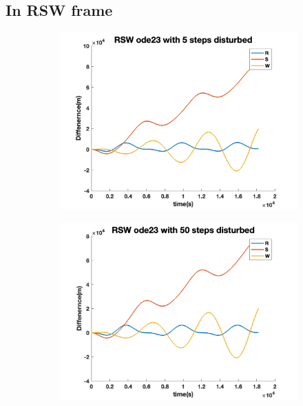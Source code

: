 \documentclass[12pt
,headinclude
,headsepline
,bibtotocnumbered
]{scrartcl}
\begin{document}
    \subsection*{In RSW frame}
    \begin{figure}[H]
        \centering
        \begin{subfigure}[b]{0.45\textwidth}
        \includegraphics[width=1\textwidth]{./plots/ode23_5_yprime_d_RSW.png}
        \end{subfigure}
        \begin{subfigure}[b]{0.45\textwidth}
        \includegraphics[width=1\textwidth]{./plots/ode23_50_yprime_d_RSW.png}
        \end{subfigure}
        \begin{subfigure}[b]{0.45\textwidth}

\end{subfigure}
\end{figure}
\end{document}
